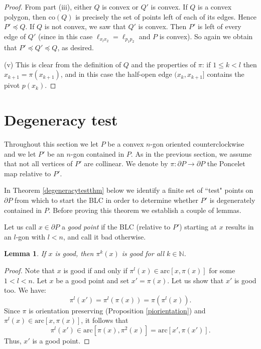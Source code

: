 \documentclass[11pt]{amsart}
\newtheorem{lemma}[theorem]{Lemma}
\theoremstyle{remark}
\numberwithin{equation}{section}
\newcommand{\N}{\mathbb{N}}
\newcommand{\co}{\mathrm{co}}
\newcommand{\arc}{\mathrm{arc}}
\renewcommand{\precsim}{\preccurlyeq}
\renewcommand{\leq}{\leqslant}
\begin{document}
\begin{proof}
From part (iii), either $Q$ is convex or $Q'$ is convex. If $Q$ is a convex polygon, then $\co(Q)$ is precisely the set of points left of each of its edges. 
Hence  $P'\precsim Q$. If $Q$ is not convex, we saw that $Q'$ is convex.  Then   $P'$ is left of every edge of   $Q'$ (since in this case $\ell_{x_lx_2}=\ell_{p_1p_2}$ and $P$ is convex). So again we obtain that $P'\precsim Q'\precsim Q$, as desired.

(v) This is clear from the definition  of $Q$ and the properties of $\pi$: if $1\leq k < l$ then $x_{k+1}=\pi(x_{k+1})$, and in this case the half-open edge $(x_k,x_{k+1}]$ contains the pivot  $p(x_k)$.
\end{proof}








\section{Degeneracy test}
Throughout this section we let $P$ be a convex $n$-gon oriented counterclockwise and we let  $P'$ be an $n$-gon contained in $P$. As in the previous section, we assume that not all vertices of $P'$ are collinear. We denote by  $\pi\colon \partial P\to \partial P$ the Poncelet map relative to $P'$.

In Theorem \ref{degeneracytestthm} below we identify a finite set of ``test"  points on $\partial P$ from which to start the BLC in order to determine whether $P'$ is degenerately contained in $P$. Before proving this theorem we establish a couple of lemmas. 

Let us call $x\in \partial P$ a \emph{good point} if the BLC  (relative to $P'$) starting at $x$ results in an $l$-gon with $l<n$, and call it bad otherwise.


\begin{lemma}\label{Fxgood}
If $x$ is good, then $\pi^k(x)$ is good for all $k\in \N$. 
\end{lemma}

\begin{proof}
Note that $x$ is good if and only if $\pi^l(x)\in \arc[x,\pi(x)]$ for some $1<l<n$. Let $x$ be a good point and set $x'=\pi(x)$. Let us show that $x'$ is good too. We have:
\[
\pi^l(x')=\pi^l(\pi(x))=\pi(\pi^l(x)).
\]
Since $\pi$ is orientation preserving (Proposition \ref{piorientation}) and $\pi^l(x)\in \arc[x,\pi(x)]$, it follows that 
\[
\pi^l(x')\in \arc[\pi(x),\pi^2(x)]=\arc[x',\pi(x')].
\]
Thus, $x'$ is a good point.
\end{proof}
\end{document}
